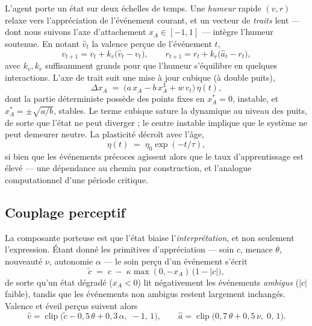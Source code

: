 \documentclass[11pt]{article}
\newcommand{\xa}{x_{A}}
\newcommand{\clip}{\operatorname{clip}}
\begin{document}
L'agent porte un état sur deux échelles de temps. Une \emph{humeur} rapide $(v, r)$
relaxe vers l'appréciation de l'événement courant, et un vecteur de \emph{traits}
lent --- dont nous suivons l'axe d'attachement $\xa \in [-1, 1]$ --- intègre l'humeur
soutenue. En notant $\hat{v}_t$ la valence perçue de l'événement $t$,
\begin{equation}
v_{t+1} = v_t + k_v\bigl(\hat{v}_t - v_t\bigr),
\qquad
r_{t+1} = r_t + k_r\bigl(\hat{a}_t - r_t\bigr),
\label{eq:mood}
\end{equation}
avec $k_v, k_r$ suffisamment grands pour que l'humeur s'équilibre en quelques
interactions. L'axe de trait suit une mise à jour cubique (à double puits),
\begin{equation}
\Delta \xa \;=\; \bigl(a\,\xa - b\,\xa^{3} + w\,v_t\bigr)\,\eta(t),
\label{eq:well}
\end{equation}
dont la partie déterministe possède des points fixes en $\xa^{*} = 0$, instable, et
$\xa^{*} = \pm\sqrt{a/b}$, stables. Le terme cubique sature la dynamique au niveau des
puits, de sorte que l'état ne peut diverger ; le centre instable implique que le
système ne peut demeurer neutre. La plasticité décroît avec l'âge,
\begin{equation}
\eta(t) \;=\; \eta_0 \exp(-t/\tau),
\label{eq:anneal}
\end{equation}
si bien que les événements précoces agissent alors que le taux d'apprentissage est
élevé --- une dépendance au chemin par construction, et l'analogue computationnel
d'une période critique.

\subsection{Couplage perceptif}

La composante porteuse est que l'état biaise l'\emph{interprétation}, et non seulement
l'expression. Étant donné les primitives d'appréciation --- soin $c$, menace $\theta$,
nouveauté $\nu$, autonomie $\alpha$ --- le soin perçu d'un événement s'écrit
\begin{equation}
\tilde{c} \;=\; c \;-\; \kappa \max(0, -\xa)\,\bigl(1 - |c|\bigr),
\label{eq:bias}
\end{equation}
de sorte qu'un état dégradé ($\xa < 0$) lit négativement les événements
\emph{ambigus} ($|c|$ faible), tandis que les événements non ambigus restent
largement inchangés. Valence et éveil perçus suivent alors
\begin{equation}
\hat{v} = \clip\bigl(\tilde{c} - 0{,}5\,\theta + 0{,}3\,\alpha,\; -1,\, 1\bigr),
\qquad
\hat{a} = \clip\bigl(0{,}7\,\theta + 0{,}5\,\nu,\; 0,\, 1\bigr).
\label{eq:adapter}
\end{equation}
\end{document}

